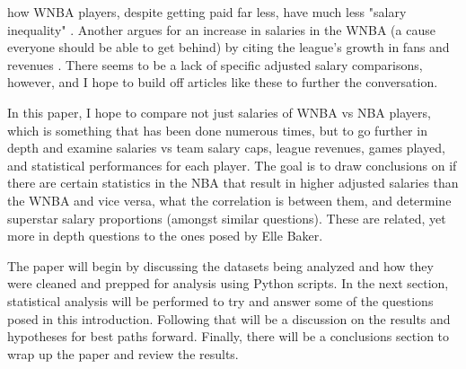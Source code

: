 \documentclass[12pt]{article}
\begin{document}
how WNBA players, despite getting paid far less, have much less "salary inequality"
\cite{baker2020comparison}. Another argues for an increase in salaries in the WNBA (a cause everyone
should be able to get behind) by citing the league's growth in fans and revenues \cite{ettienne2019s}.
There seems to be a lack of specific adjusted salary comparisons, however, and I hope to build off articles
like these to further the conversation.
\par
In this paper, I hope to compare not just salaries of WNBA vs NBA players, which is something that has been done 
numerous times, but to go further in depth and examine salaries vs team salary caps, league revenues, games played, 
and statistical performances for each player. The goal is to draw conclusions on if there are certain statistics in 
the NBA that result in higher adjusted salaries than the WNBA and vice versa, what the correlation is between them, 
and determine superstar salary proportions (amongst similar questions). These are related, yet more in depth questions 
to the ones posed by Elle Baker.
\par
The paper will begin by discussing the datasets being analyzed and how they were cleaned and prepped for analysis using 
Python scripts. In the next section, statistical analysis will be performed to try and answer some of the questions 
posed in this introduction. Following that will be a discussion on the results and hypotheses for best paths forward. 
Finally, there will be a conclusions section to wrap up the paper and review the results.
\end{document}

